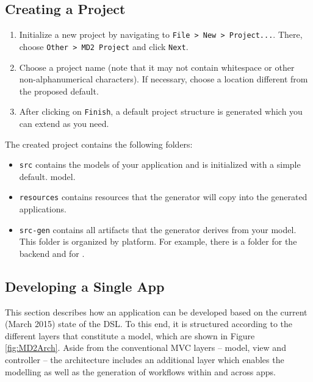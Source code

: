 \subsection{Creating a Project}
\begin{enumerate}
\item  Initialize a new project by navigating to \lstinline[language=Simple]|File > New > Project...|. There, choose \lstinline[language=Simple]|Other > MD2 Project| and click \lstinline|Next|.
\item Choose a project name (note that it may not contain whitespace or other non-alphanumerical characters). If necessary, choose a location different from the proposed default.
\item After clicking on \lstinline|Finish|, a default project structure is generated which you can extend as you need.
\end{enumerate}

The created project contains the following folders:

\begin{itemize}
\item \lstinline[language=Simple]|src| contains the \MD models of your application and is initialized with a simple default. model.
\item \lstinline[language=Simple]|resources| contains resources that the generator will copy into the generated applications.
\item \lstinline[language=Simple]|src-gen| contains all artifacts that the generator derives from your model. This folder is organized by platform. For example, there is a folder for the backend and for \mapapps.
\end{itemize}

\subsection{Developing a Single App} 
\label{subsec:SingleAppDev}
This section describes how an application can be developed based on the current (March 2015) state of the \MD DSL. To this end, it is structured according to the different layers that constitute a \MD model, which are shown in Figure \ref{fig:MD2Arch}. Aside from the conventional MVC layers -- model, view and controller -- the architecture includes an additional layer which enables the modelling as well as the generation of workflows within and across apps.

